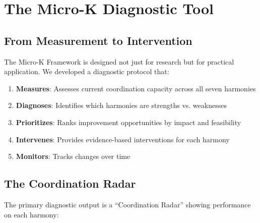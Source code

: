 \documentclass[12pt,a4paper]{article}
\begin{document}
\section{The Micro-K Diagnostic Tool}
\label{sec:diagnostic}

\subsection{From Measurement to Intervention}

The Micro-K Framework is designed not just for research but for practical application. We developed a diagnostic protocol that:

\begin{enumerate}
    \item \textbf{Measures}: Assesses current coordination capacity across all seven harmonies
    \item \textbf{Diagnoses}: Identifies which harmonies are strengths vs. weaknesses
    \item \textbf{Prioritizes}: Ranks improvement opportunities by impact and feasibility
    \item \textbf{Intervenes}: Provides evidence-based interventions for each harmony
    \item \textbf{Monitors}: Tracks changes over time
\end{enumerate}

\subsection{The Coordination Radar}

The primary diagnostic output is a ``Coordination Radar'' showing performance on each harmony:
\end{document}
